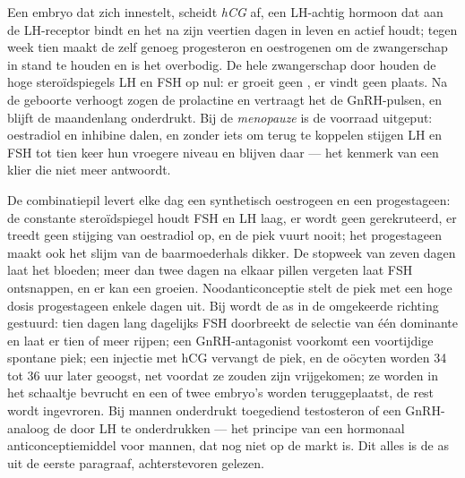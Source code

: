 \begin{proposition}\label{prop:b2:reproductive-hormones:overrides}
Een embryo dat zich innestelt, scheidt \emph{hCG} af, een LH-achtig hormoon
dat aan de LH-receptor bindt en het  na zijn veertien dagen in
leven en actief houdt; tegen week tien maakt de  zelf genoeg
progesteron en oestrogenen om de zwangerschap in stand te houden en is het
 overbodig. De hele zwangerschap door houden de hoge
steroïdspiegels LH en FSH op nul: er groeit geen , er vindt geen
 plaats. Na de geboorte verhoogt zogen de prolactine en vertraagt
het de GnRH-pulsen, en blijft de  maandenlang onderdrukt. Bij de
\emph{menopauze} is de voorraad  uitgeput: oestradiol en inhibine
dalen, en zonder iets om terug te koppelen stijgen LH en FSH tot tien keer
hun vroegere niveau en blijven daar --- het kenmerk van een klier die niet
meer antwoordt.
\end{proposition}

\begin{proposition}\label{prop:b2:reproductive-hormones:clinic}
De combinatiepil levert elke dag een synthetisch oestrogeen en een
progestageen: de constante steroïdspiegel houdt FSH en LH laag, er wordt
geen  gerekruteerd, er treedt geen stijging van oestradiol op, en
de piek vuurt nooit; het progestageen maakt ook het slijm van de
baarmoederhals dikker. De stopweek van zeven dagen laat het 
bloeden; meer dan twee dagen na elkaar pillen vergeten laat FSH ontsnappen,
en er kan een  groeien. Noodanticonceptie stelt de piek met een
hoge dosis progestageen enkele dagen uit. Bij \emph{}
wordt de as in de omgekeerde richting gestuurd: tien dagen lang dagelijks
FSH doorbreekt de selectie van één dominante  en laat er tien of
meer rijpen; een GnRH-antagonist voorkomt een voortijdige spontane piek;
een injectie met hCG vervangt de piek, en de oöcyten worden 34 tot 36 uur
later geoogst, net voordat ze zouden zijn vrijgekomen; ze worden in het
schaaltje bevrucht en een of twee embryo's worden teruggeplaatst, de rest
wordt ingevroren. Bij mannen onderdrukt toegediend testosteron of een
GnRH-analoog de  door LH te onderdrukken --- het principe
van een hormonaal anticonceptiemiddel voor mannen, dat nog niet op de markt
is. Dit alles is de as uit de eerste paragraaf, achterstevoren gelezen.
\end{proposition}

